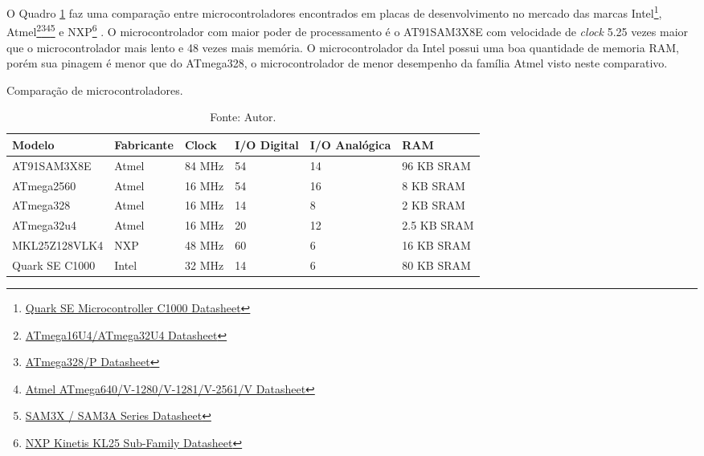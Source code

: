 O Quadro \ref{tab:microcontroladores} faz uma comparação entre microcontroladores encontrados em placas de desenvolvimento no mercado das marcas Intel\footnote{\href{https://www.intel.com/content/dam/www/public/us/en/documents/datasheets/quark-c1000-datasheet.pdf}{Quark SE Microcontroller C1000 Datasheet}}, Atmel\footnote{\href{http://www.atmel.com/Images/Atmel-7766-8-bit-AVR-ATmega16U4-32U4_Datasheet.pdf}{ATmega16U4/ATmega32U4 Datasheet}}\footnote{\href{http://www.atmel.com/Images/Atmel-42735-8-bit-AVR-Microcontroller-ATmega328-328P_Datasheet.pdf}{ATmega328/P Datasheet}}\footnote{\href{http://www.atmel.com/Images/Atmel-2549-8-bit-AVR-Microcontroller-ATmega640-1280-1281-2560-2561_datasheet.pdf}{Atmel ATmega640/V-1280/V-1281/V-2561/V Datasheet}}\footnote{\href{http://www.atmel.com/Images/Atmel-11057-32-bit-Cortex-M3-Microcontroller-SAM3X-SAM3A_Datasheet.pdf}{SAM3X / SAM3A Series Datasheet}} e NXP\footnote{\href{https://www.nxp.com/docs/en/data-sheet/KL25P80M48SF0.pdf}{NXP Kinetis KL25 Sub-Family Datasheet}} . 
O microcontrolador com maior poder de processamento é o AT91SAM3X8E com velocidade de \textit{clock} 5.25 vezes maior que o microcontrolador mais lento e 48 vezes mais memória. O microcontrolador da Intel possui uma boa quantidade de memoria RAM, porém sua pinagem é menor que do ATmega328, o microcontrolador de menor desempenho da família Atmel visto neste comparativo. 
\begin{table}[!htb]
	\centering
	\caption{Comparação de microcontroladores.}
	\label{tab:microcontroladores}
	\begin{tabular}{|l|l|l|l|l|l|}
		\hline
		\rowcolor[HTML]{9B9B9B} 
		\textbf{Modelo}  & \textbf{Fabricante} & \textbf{Clock} & \textbf{I/O Digital} & \textbf{I/O Analógica} & \textbf{RAM} \\ \hline
		AT91SAM3X8E    & Atmel               & 84 MHz         & 54                   & 14                     & 96 KB SRAM   \\ \hline
		ATmega2560     & Atmel               & 16 MHz          & 54                   & 16                     & 8 KB SRAM    \\ \hline
		ATmega328     & Atmel               & 16 MHz         & 14                   & 8                      & 2 KB SRAM    \\ \hline
		ATmega32u4     & Atmel               & 16 MHz          & 20                   & 12                     & 2.5 KB SRAM  \\ \hline
		MKL25Z128VLK4  & NXP                 & 48 MHz          & 60                   & 6                      & 16 KB SRAM   \\ \hline
		Quark SE C1000 & Intel               & 32 MHz         & 14                   & 6                      & 80 KB SRAM   \\ \hline
		\end{tabular}
	\caption*{Fonte: Autor.}
\end{table}


